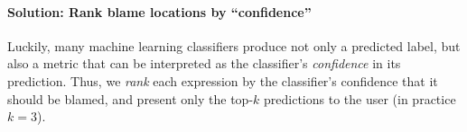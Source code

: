 \paragraph{\textbf{Solution: Rank blame locations by ``confidence''}}
Luckily, many machine learning classifiers produce not only a predicted
label, but also a metric that can be interpreted as the classifier's
\emph{confidence} in its prediction.
%
Thus, we \emph{rank} each expression by the classifier's confidence that
it should be blamed, and present only the top-$k$ predictions to the
user (in practice $k=3$).



